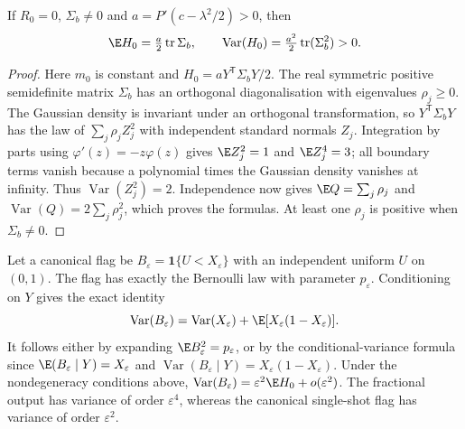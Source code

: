 \begin{corollary}\label{cor:weak-centred}
If $R_0=0$, $\Sigma_b\ne0$ and
$a=P'(c-\lambda^2/2)>0$, then
\begin{equation}
 \E H_0=\tfrac a2\operatorname{tr}\Sigma_b,\qquad
 \operatorname{Var}(H_0)=\tfrac{a^2}{2}
                         \operatorname{tr}(\Sigma_b^2)>0.
\end{equation}
\end{corollary}

\begin{proof}
Here $m_0$ is constant and $H_0=aY^{\mathsf T}\Sigma_bY/2$.
The real symmetric positive semidefinite matrix $\Sigma_b$ has an
orthogonal diagonalisation with eigenvalues $\rho_j\geq0$.
The Gaussian density is invariant under an orthogonal transformation,
so $Y^{\mathsf T}\Sigma_bY$ has the law of
$\sum_j\rho_j Z_j^2$ with independent standard normals $Z_j$.
Integration by parts using $\varphi'(z)=-z\varphi(z)$ gives
$\E Z_j^2=1$ and $\E Z_j^4=3$; all boundary terms vanish because
a polynomial times the Gaussian density vanishes at infinity.
Thus $\operatorname{Var}(Z_j^2)=2$. Independence now gives
$\E Q=\sum_j\rho_j$ and
$\operatorname{Var}(Q)=2\sum_j\rho_j^2$, which proves the formulas.
At least one $\rho_j$ is positive when $\Sigma_b\ne0$.
\end{proof}

Let a canonical flag be
$B_\varepsilon=\mathbf1\{U<X_\varepsilon\}$ with an independent
uniform $U$ on $(0,1)$. The flag has exactly the Bernoulli law with
parameter $p_\varepsilon$. Conditioning on $Y$ gives the exact identity
\begin{equation}\label{eq:flag-variance-loss}
 \operatorname{Var}(B_\varepsilon)
 =\operatorname{Var}(X_\varepsilon)+
                        \E[X_\varepsilon(1-X_\varepsilon)].
\end{equation}
It follows either by expanding $\E B_\varepsilon^2=p_\varepsilon$,
or by the conditional-variance formula since
$\E(B_\varepsilon\mid Y)=X_\varepsilon$ and
$\operatorname{Var}(B_\varepsilon\mid Y)
=X_\varepsilon(1-X_\varepsilon)$.
Under the nondegeneracy conditions above,
$\operatorname{Var}(B_\varepsilon)
 =\varepsilon^2\E H_0+o(\varepsilon^2)$.
The fractional output has variance of order $\varepsilon^4$, whereas
the canonical single-shot flag has variance of order $\varepsilon^2$.

